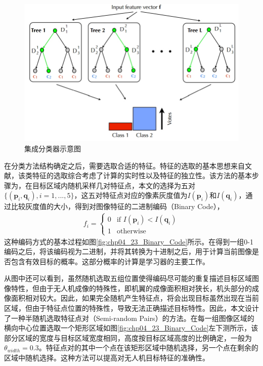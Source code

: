 \begin{figure}[ht]   
	\centering
	\includegraphics[width=\textwidth]{figs/161002_Thesis_Tracking_Section_05.pdf}
	\caption{集成分类器示意图}
	\label{fig:161002_Thesis_Tracking_Section_05}
\end{figure}

在分类方法结构确定之后，需要选取合适的特征。特征的选取的基本思想来自文献\cite{lepetit2005randomized}，该类特征的选取综合考虑了计算的实时性以及特征的独立性。该方法的基本步骤为，在目标区域内随机采样几对特征点，本文的选择为五对$\{(\mathbf{p}_i,\mathbf{q}_i),i=1,...,5\}$，这五对特征点对应的像素灰度值为$I(\mathbf{p}_i)$和$I(\mathbf{q}_i)$，通过比较灰度值的大小，得到对图像特征的二进制编码（Binary Code），
\begin{align}
f_i=\left\{ \begin{array}{ll}
0 &\mbox{if $I(\mathbf{p}_i) < I(\mathbf{q}_i)$} \\
1 &\mbox{otherwise} \end{array} \right.
\end{align}
这种编码方式的基本过程如图\ref{fig:chp04_23_Binary_Code}所示。在得到一组0-1编码之后，将该编码视为二进制，并将其转换为十进制之后，用于计算当前图像是否包含有效目标的概率。这部分概率的计算是学习器的主要工作。

从图中还可以看到，虽然随机选取五组位置使得编码尽可能的重复描述目标区域图像特性，但由于无人机成像的特殊性，即机翼的成像面积相对狭长，机头部分的成像面积相对较大。因此，如果完全随机产生特征点，将会出现目标虽然出现在当前区域，但由于特征点位置的特殊性，导致无法正确描述目标特性。因此，本文设计了一种半随机选取特征点对（Semi-random Pairs）的方法。在每一组图像区域的横向中心位置选取一个矩形区域如图\ref{fig:chp04_23_Binary_Code}左下测所示，该部分区域的宽度与目标区域宽度相同，高度按目标区域高度的比例确定，一般为$\theta_{width}=0.3$。特征点对的其中一个点在该矩形区域中随机选择，另一个点在剩余的区域中随机选择。这种方法可以提高对无人机目标特征的准确性。

